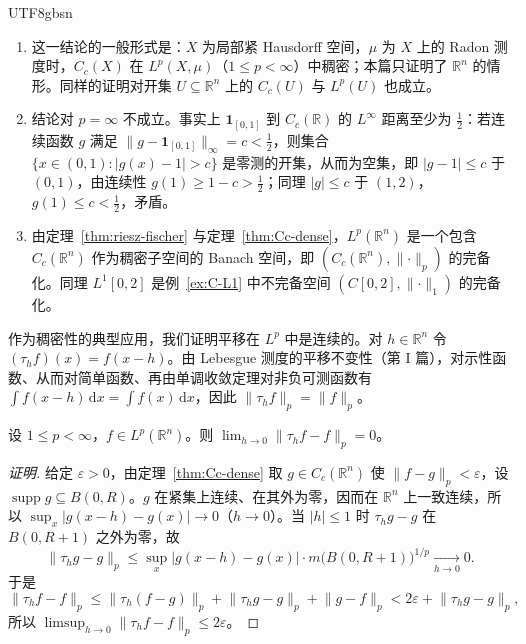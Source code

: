 \documentclass[11pt]{article}
\newcommand{\R}{\mathbb{R}}
\newcommand{\norm}[1]{\lVert #1\rVert}
\newcommand{\dx}{\,\mathrm{d}x}
\newcommand{\ind}{\mathbf{1}}
\DeclareMathOperator{\supp}{supp}
\begin{document}
\begin{CJK*}{UTF8}{gbsn}
\begin{remark}
\begin{enumerate}
\item 这一结论的一般形式是：$X$ 为局部紧 Hausdorff 空间，$\mu$ 为 $X$ 上的 Radon 测度时，$C_{c}(X)$ 在 $L^{p}(X,\mu)$（$1\le p<\infty$）中稠密；本篇只证明了 $\R^{n}$ 的情形。同样的证明对开集 $U\subseteq\R^{n}$ 上的 $C_{c}(U)$ 与 $L^{p}(U)$ 也成立。
\item 结论对 $p=\infty$ 不成立。事实上 $\ind_{[0,1]}$ 到 $C_{c}(\R)$ 的 $L^{\infty}$ 距离至少为 $\frac12$：若连续函数 $g$ 满足 $\norm{g-\ind_{[0,1]}}_{\infty}=c<\frac12$，则集合 $\{x\in(0,1):|g(x)-1|>c\}$ 是零测的开集，从而为空集，即 $|g-1|\le c$ 于 $(0,1)$，由连续性 $g(1)\ge1-c>\frac12$；同理 $|g|\le c$ 于 $(1,2)$，$g(1)\le c<\frac12$，矛盾。
\item 由定理~\ref{thm:riesz-fischer} 与定理~\ref{thm:Cc-dense}，$L^{p}(\R^{n})$ 是一个包含 $C_{c}(\R^{n})$ 作为稠密子空间的 Banach 空间，即 $(C_{c}(\R^{n}),\norm{\cdot}_{p})$ 的完备化。同理 $L^{1}[0,2]$ 是例~\ref{ex:C-L1} 中不完备空间 $(C[0,2],\norm{\cdot}_{1})$ 的完备化。
\end{enumerate}
\end{remark}

作为稠密性的典型应用，我们证明平移在 $L^{p}$ 中是连续的。对 $h\in\R^{n}$ 令 $(\tau_{h}f)(x)=f(x-h)$。由 Lebesgue 测度的平移不变性（第 I 篇），对示性函数、从而对简单函数、再由单调收敛定理对非负可测函数有 $\int f(x-h)\dx=\int f(x)\dx$，因此 $\norm{\tau_{h}f}_{p}=\norm{f}_{p}$。

\begin{theorem}[平移的连续性]\label{thm:translation}
设 $1\le p<\infty$，$f\in L^{p}(\R^{n})$。则 $\lim_{h\to0}\norm{\tau_{h}f-f}_{p}=0$。
\end{theorem}

\begin{proof}[证明]
给定 $\varepsilon>0$，由定理~\ref{thm:Cc-dense} 取 $g\in C_{c}(\R^{n})$ 使 $\norm{f-g}_{p}<\varepsilon$，设 $\supp g\subseteq B(0,R)$。$g$ 在紧集上连续、在其外为零，因而在 $\R^{n}$ 上一致连续，所以 $\sup_{x}|g(x-h)-g(x)|\to0$（$h\to0$）。当 $|h|\le1$ 时 $\tau_{h}g-g$ 在 $B(0,R+1)$ 之外为零，故
\[
\norm{\tau_{h}g-g}_{p}\le\sup_{x}|g(x-h)-g(x)|\cdot m\bigl(B(0,R+1)\bigr)^{1/p}\xrightarrow[h\to0]{}0 .
\]
于是
\[
\norm{\tau_{h}f-f}_{p}\le\norm{\tau_{h}(f-g)}_{p}+\norm{\tau_{h}g-g}_{p}+\norm{g-f}_{p}<2\varepsilon+\norm{\tau_{h}g-g}_{p},
\]
所以 $\limsup_{h\to0}\norm{\tau_{h}f-f}_{p}\le2\varepsilon$。
\end{proof}


\end{CJK*}
\end{document}
